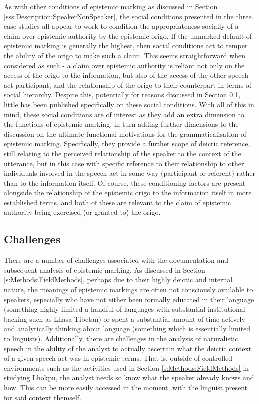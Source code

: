 As with other conditions of epistemic marking as discussed in Section \ref{sss:Description:SpeakerNonSpeaker}, the social conditions presented in the three case studies all appear to work to condition the appropriateness socially of a claim over epistemic authority by the epistemic origo. If the unmarked default of epistemic marking is generally the highest, then social conditions act to temper the ability of the origo to make such a claim. This seems straightforward when considered as such - a claim over epistemic authority is reliant not only on the access of the origo to the information, but also of the access of the other speech act participant, and the relationship of the origo to their counterpart in terms of social hierarchy. Despite this, potentially for reasons discussed in Section \ref{ss:Discussion:SocialChallenges}, little has been published specifically on these social conditions. With all of this in mind, these social conditions are of interest as they add an extra dimension to the functions of epistemic marking, in turn adding further dimensions to the discussion on the ultimate functional motivations for the grammaticalisation of epistemic marking. Specifically, they provide a further scope of deictic reference, still relating to the perceived relationship of the speaker to the context of the utterance, but in this case with specific reference to their relationship to other individuals involved in the speech act in some way (participant or referent) rather than to the information itself. Of course, these conditioning factors are present alongside the relationship of the epistemic origo to the information itself in more established terms, and both of these are relevant to the claim of epistemic authority being exercised (or granted to) the origo.

\subsection{Challenges}\label{ss:Discussion:SocialChallenges}
There are a number of challenges associated with the documentation and subsequent analysis of epistemic marking. As discussed in Section \ref{s:Methods:FieldMethods}, perhaps due to their highly deictic and internal nature, the meanings of epistemic markings are often not consciously available to speakers, especially who have not either been formally educated in their language (something highly limited a handful of languages with substantial institutional backing such as Lhasa Tibetan) or spent a substantial amount of time actively and analytically thinking about language (something which is essentially limited to linguists). Additionally, there are challenges in the analysis of naturalistic speech in the ability of the analyst to actually ascertain what the deictic context of a given speech act was in epistemic terms. That is, outside of controlled environments such as the activities used in Section \ref{s:Methods:FieldMethods} in studying Lhokpu, the analyst needs so know what the speaker already knows and how. This can be more easily accessed in the moment, with the linguist present for said context themself.

